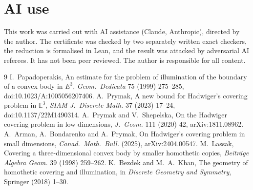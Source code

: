 \documentclass[11pt]{article}
\begin{document}
\section*{AI use}
This work was carried out with AI assistance (Claude, Anthropic), directed by the author. The certificate was
checked by two separately written exact checkers, the reduction is formalised in Lean, and the result was attacked
by adversarial AI referees. It has not been peer reviewed. The author is responsible for all content.

\begin{thebibliography}{9}
 I.~Papadoperakis, An estimate for the problem of illumination of the boundary of a convex body in
  $E^3$, \emph{Geom.\ Dedicata} 75 (1999) 275--285, doi:10.1023/A:1005056207406.
 A.~Prymak, A new bound for Hadwiger's covering problem in $\mathbb{E}^3$, \emph{SIAM J.\ Discrete
  Math.} 37 (2023) 17--24, doi:10.1137/22M1490314.
 A.~Prymak and V.~Shepelska, On the Hadwiger covering problem in low dimensions, \emph{J.\ Geom.}
  111 (2020) 42, arXiv:1811.08962.
 A.~Arman, A.~Bondarenko and A.~Prymak, On Hadwiger's covering problem in small dimensions,
  \emph{Canad.\ Math.\ Bull.} (2025), arXiv:2404.00547.
 M.~Lassak, Covering a three-dimensional convex body by smaller homothetic copies,
  \emph{Beitr\"age Algebra Geom.} 39 (1998) 259--262.
 K.~Bezdek and M.~A.~Khan, The geometry of homothetic covering and illumination, in \emph{Discrete
  Geometry and Symmetry}, Springer (2018) 1--30.
\end{thebibliography}
\end{document}
